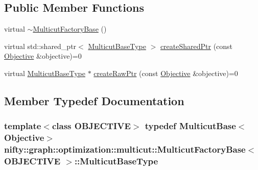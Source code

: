 \subsection*{Public Member Functions}
\begin{DoxyCompactItemize}
\item 
virtual \hyperlink{classnifty_1_1graph_1_1optimization_1_1multicut_1_1MulticutFactoryBase_a81000ccac94b4f52cf05c60766aac71d}{$\sim$\+Multicut\+Factory\+Base} ()
\item 
virtual std\+::shared\+\_\+ptr$<$ \hyperlink{classnifty_1_1graph_1_1optimization_1_1multicut_1_1MulticutFactoryBase_a2d8fbd85c1542fef172da90ef55af326}{Multicut\+Base\+Type} $>$ \hyperlink{classnifty_1_1graph_1_1optimization_1_1multicut_1_1MulticutFactoryBase_ac52c478b8a0e47218237e7809470bf12}{create\+Shared\+Ptr} (const \hyperlink{classnifty_1_1graph_1_1optimization_1_1multicut_1_1MulticutFactoryBase_a598ed08cf4e7b1c9ab0573213eb4e88d}{Objective} \&objective)=0
\item 
virtual \hyperlink{classnifty_1_1graph_1_1optimization_1_1multicut_1_1MulticutFactoryBase_a2d8fbd85c1542fef172da90ef55af326}{Multicut\+Base\+Type} $\ast$ \hyperlink{classnifty_1_1graph_1_1optimization_1_1multicut_1_1MulticutFactoryBase_a027261123faace150afd4667a4c39ded}{create\+Raw\+Ptr} (const \hyperlink{classnifty_1_1graph_1_1optimization_1_1multicut_1_1MulticutFactoryBase_a598ed08cf4e7b1c9ab0573213eb4e88d}{Objective} \&objective)=0
\end{DoxyCompactItemize}


\subsection{Member Typedef Documentation}
\hypertarget{classnifty_1_1graph_1_1optimization_1_1multicut_1_1MulticutFactoryBase_a2d8fbd85c1542fef172da90ef55af326}{}
\subsubsection[{Multicut\+Base\+Type}]{\setlength{\rightskip}{0pt plus 5cm}template$<$class O\+B\+J\+E\+C\+T\+I\+V\+E$>$ typedef {\bf Multicut\+Base}$<${\bf Objective}$>$ {\bf nifty\+::graph\+::optimization\+::multicut\+::\+Multicut\+Factory\+Base}$<$ O\+B\+J\+E\+C\+T\+I\+V\+E $>$\+::{\bf Multicut\+Base\+Type}}\label{classnifty_1_1graph_1_1optimization_1_1multicut_1_1MulticutFactoryBase_a2d8fbd85c1542fef172da90ef55af326}
\hypertarget{classnifty_1_1graph_1_1optimization_1_1multicut_1_1MulticutFactoryBase_a598ed08cf4e7b1c9ab0573213eb4e88d}{}
